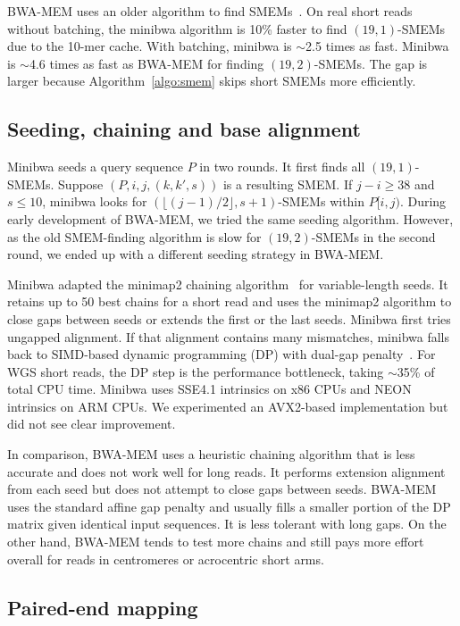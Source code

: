 \documentclass[webpdf,contemporary,large,namedate]{oup-authoring-template}%
\begin{document}
BWA-MEM uses an older algorithm to find SMEMs~\citep{Li:2012fk}.
On real short reads without batching, the minibwa algorithm is 10\% faster to find $(19,1)$-SMEMs due to the 10-mer cache.
With batching, minibwa is $\sim$2.5 times as fast.
Minibwa is $\sim$4.6 times as fast as BWA-MEM for finding $(19,2)$-SMEMs.
The gap is larger because Algorithm~\ref{algo:smem} skips short SMEMs more efficiently.

\subsection{Seeding, chaining and base alignment}\label{sec:align}

Minibwa seeds a query sequence $P$ in two rounds.
It first finds all $(19,1)$-SMEMs.
Suppose $(P,i,j,(k,k',s))$ is a resulting SMEM.
If $j-i\ge38$ and $s\le10$,
minibwa looks for $(\lfloor(j-1)/2\rfloor,s+1)$-SMEMs within $P[i,j)$.
During early development of BWA-MEM, we tried the same seeding algorithm.
However, as the old SMEM-finding algorithm is slow for $(19,2)$-SMEMs in the second round,
we ended up with a different seeding strategy in BWA-MEM.

Minibwa adapted the minimap2 chaining algorithm~\citep{Li:2018ab} for variable-length seeds.
It retains up to 50 best chains for a short read
and uses the minimap2 algorithm to close gaps between seeds or extends the first or the last seeds.
Minibwa first tries ungapped alignment.
If that alignment contains many mismatches, minibwa falls back to SIMD-based dynamic programming (DP) with dual-gap penalty~\citep{Suzuki:2018aa}.
For WGS short reads, the DP step is the performance bottleneck, taking $\sim$35\% of total CPU time.
Minibwa uses SSE4.1 intrinsics on x86 CPUs and NEON intrinsics on ARM CPUs.
We experimented an AVX2-based implementation but did not see clear improvement.

In comparison, BWA-MEM uses a heuristic chaining algorithm that is less accurate and does not work well for long reads.
It performs extension alignment from each seed but does not attempt to close gaps between seeds.
BWA-MEM uses the standard affine gap penalty and usually fills a smaller portion of the DP matrix given identical input sequences.
It is less tolerant with long gaps.
On the other hand, BWA-MEM tends to test more chains and still pays more effort overall for reads in centromeres or acrocentric short arms.

\subsection{Paired-end mapping}\label{sec:pe}
\end{document}
